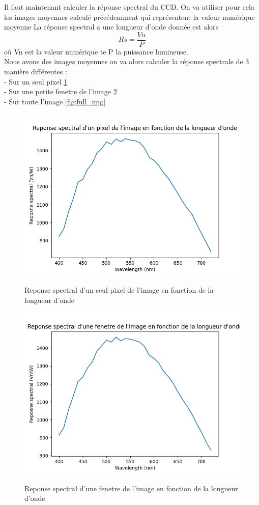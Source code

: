 \documentclass{article}
\begin{document}
Il faut maintenant calculer la réponse spectral du CCD. On va utiliser pour cela les images moyennes calculé précédemment qui représentent la valeur numérique moyenne
La réponse spectral a une longueur d'onde donnée est alors  $$Rs = \frac{Vn}{P}$$
où Vn est la valeur numérique te P la puissance lumineuse. \\
Nous avons des images moyennes on va alors calculer la réponse spectrale de 3 manière différentes : \\
    - Sur un seul pixel \ref{fig:pixel} \\
    - Sur une petite fenetre de l'image \ref{fig:fenetre} \\
    - Sur toute l'image \ref{fig:full_img} \\
  
\begin{figure}[H]
\centering
\includegraphics[scale=0.7]{pixel.png}
\label{fig:pixel}
\caption{Reponse spectral d'un seul pixel de l'image en fonction de la longueur d'onde}
\end{figure}

\begin{figure}[H]
\centering
\includegraphics[scale=0.7]{fenetre.png}
\label{fig:fenetre}
\caption{Reponse spectral d'une fenetre de l'image en fonction de la longueur d'onde}
\end{figure}
\end{document}
